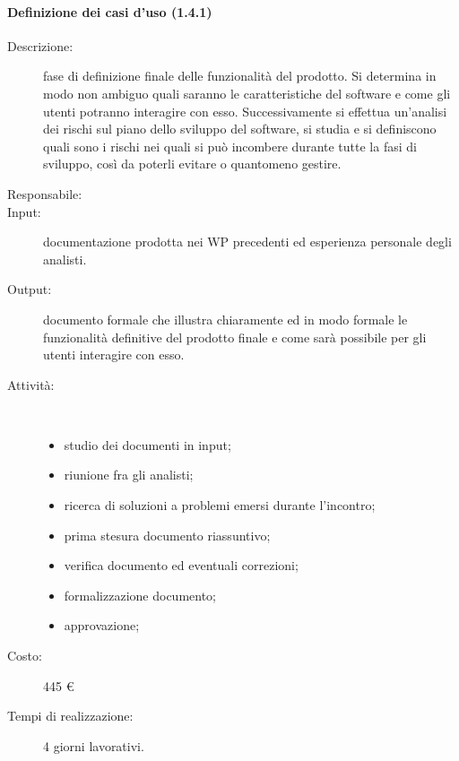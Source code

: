 \paragraph{Definizione dei casi d'uso (1.4.1)}
\begin{description}
\item[Descrizione:]fase di definizione finale delle funzionalit\`{a} del prodotto. Si determina in modo non ambiguo quali saranno le caratteristiche del software e come gli utenti potranno interagire con esso. Successivamente si effettua un'analisi dei rischi sul piano dello sviluppo del software, si studia e si definiscono quali sono i rischi nei quali si pu\`{o} incombere durante tutte la fasi di sviluppo, cos\`{i} da poterli evitare o quantomeno gestire.
\item[Responsabile:] 
\item[Input: ]documentazione prodotta nei WP precedenti ed esperienza personale degli analisti.
\item[Output:] documento formale che illustra chiaramente ed in modo formale le funzionalità definitive del prodotto finale e come sarà possibile per gli utenti interagire con esso.
\item[Attività:]\mbox{}\\[-1.5\baselineskip]
	\begin{itemize}
	\item studio dei documenti in input;
	\item riunione fra gli analisti;
	\item ricerca di soluzioni a problemi emersi durante l'incontro;
	\item prima stesura documento riassuntivo;
	\item verifica documento ed eventuali correzioni;
	\item formalizzazione documento;
	\item approvazione;
	\end{itemize}
\item[Costo:] 445 \euro{}
\item[Tempi di realizzazione:] 4 giorni lavorativi.
\end{description}

